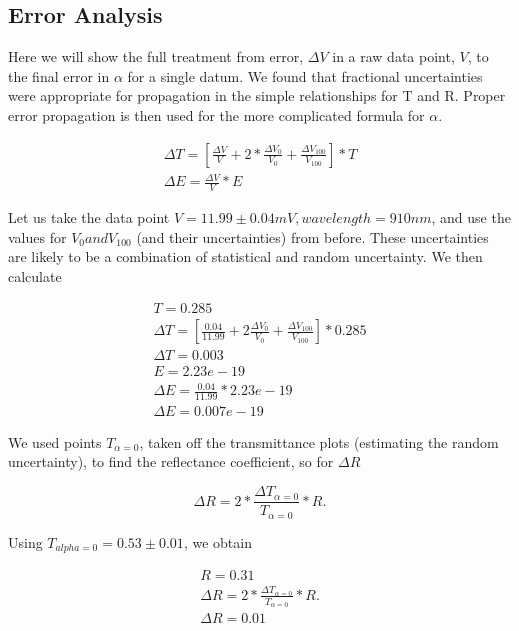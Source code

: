\documentclass{article}
\begin{document}
\subsection{Error Analysis}

Here we will show the full treatment from error, $\Delta V$ in a raw data point, $V$, to the final error in $\alpha$ for a single datum. We found that fractional uncertainties were appropriate for propagation in the simple relationships for T and R. Proper error propagation is then used for the more complicated formula for $\alpha$.

\begin{gather}
	\Delta T =  [\frac{\Delta V}{V} + 2*\frac{\Delta V_0}{V_0} + \frac{\Delta V_{100}}{V_{100}}] * T \\
	\Delta E = \frac{\Delta V}{V} * E
\end{gather}

Let us take the data point $V =  11.99 \pm 0.04mV, wavelength = 910nm$, and use the values for $V_0 and V_{100}$ (and their uncertainties) from before. These uncertainties are likely to be a combination of statistical and random uncertainty. We then calculate

\begin{gather}
	T = 0.285 \\
	\Delta T =  [\frac{0.04}{11.99} + 2\frac{\Delta V_0}{V_0} + \frac{\Delta V_{100}}{V_{100}}] * 0.285 \\
	\Delta T = 0.003 \\
	E = 2.23e-19 \\
	\Delta E = \frac{0.04}{11.99} * 2.23e-19 \\
	\Delta E = 0.007e-19
\end{gather}

We used points $T_{\alpha=0}$, taken off the transmittance plots (estimating the random uncertainty), to find the reflectance coefficient, so for $\Delta R$

\begin{equation}
	\Delta R = 2 * \frac{\Delta T_{\alpha=0}}{T_{\alpha=0}} * R.
\end{equation}

Using $T_{alpha=0}=0.53 \pm 0.01$, we obtain

\begin{gather}
	R = 0.31 \\
	\Delta R = 2 * \frac{\Delta T_{\alpha=0}}{T_{\alpha=0}} * R. \\
	\Delta R = 0.01
\end{gather}
\end{document}
